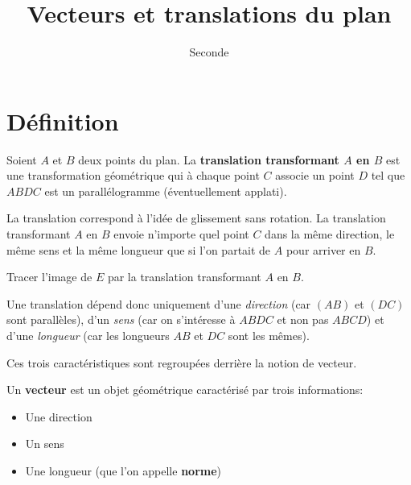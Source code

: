 \documentclass{poly}
\title{Vecteurs et translations du plan}
\date{}
\author{Seconde}
\begin{document}
\maketitle
\section{Définition}
\begin{definition}
Soient $A$ et $B$ deux points du plan. La \textbf{translation transformant $A$ en $B$} est une transformation géométrique qui à chaque point $C$ associe un point $D$ tel que $ABDC$ est un parallélogramme (éventuellement applati).     
\end{definition}
\begin{example} \hfill

\begin{minipage}{0.45\textwidth}
\begin{center}
\end{center}    
\end{minipage}
\hfill
\begin{minipage}{0.45\textwidth}
La translation correspond à l'idée de \og glissement \fg sans rotation. La translation transformant $A$ en $B$ envoie n'importe quel point $C$ dans la même direction, le même sens et la même longueur que si l'on partait de $A$ pour arriver en $B$.

Tracer l'image de $E$ par la translation transformant $A$ en $B$.
\end{minipage}
\end{example}
\begin{remark}
Une translation dépend donc uniquement d'une \emph{direction} (car $(AB)$ et $(DC)$ sont parallèles), d'un \emph{sens} (car on s'intéresse à $ABDC$ et non pas $ABCD$) et d'une \emph{longueur} (car les longueurs $AB$ et $DC$ sont les mêmes). 

Ces trois caractéristiques sont regroupées derrière la notion de vecteur. 
\end{remark}
\begin{definition}
Un \textbf{vecteur} est un objet géométrique caractérisé par trois informations:
\begin{itemize}
\item Une direction
\item Un sens
\item Une longueur (que l'on appelle \textbf{norme})
\end{itemize}
\end{definition}
\end{document}
